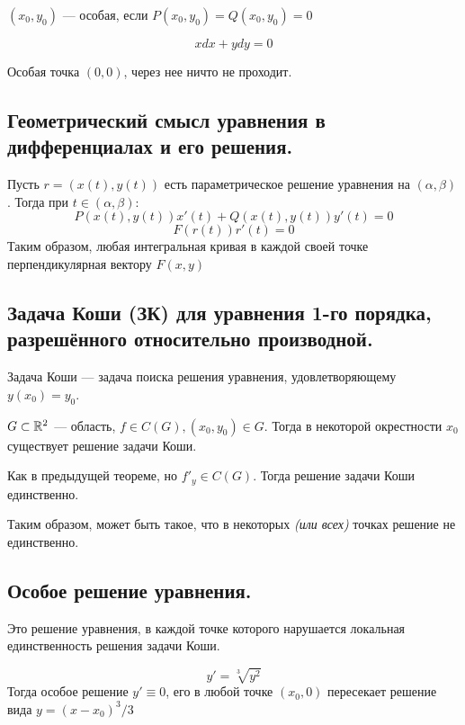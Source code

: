 \((x_0, y_0)\) --- особая, если \(P(x_0, y_0) = Q(x_0, y_0) = 0\)

\begin{example}
    \[xdx + ydy = 0\]

    Особая точка \((0, 0)\), через нее ничто не проходит.
\end{example}

\subsection*{Геометрический смысл уравнения в дифференциалах и его решения.}

Пусть \(r = (x(t), y(t))\) есть параметрическое решение уравнения на \((\alpha, \beta)\). Тогда при \(t\in(\alpha, \beta)\):
\[P(x(t), y(t))x'(t) + Q(x(t), y(t))y'(t) = 0\]
\[F(r(t))r'(t) = 0\]
Таким образом, любая интегральная кривая в каждой своей точке перпендикулярная вектору \(F(x, y)\)

\subsection*{Задача Коши (ЗК) для уравнения 1-го порядка, разрешённого относительно производной.}

Задача Коши --- задача поиска решения уравнения, удовлетворяющему \(y(x_0) = y_0\).

\begin{theorem}
    \(G\subset\mathbb{R}^2\) --- область, \(f\in C(G), (x_0, y_0)\in G\). Тогда в некоторой окрестности \(x_0\) существует решение задачи Коши.
\end{theorem}
\begin{theorem}
    Как в предыдущей теореме, но \(f'_y\in C(G)\). Тогда решение задачи Коши единственно.
\end{theorem}

Таким образом, может быть такое, что в некоторых \textit{(или всех)} точках решение не единственно.

\subsection*{Особое решение уравнения.}

Это решение уравнения, в каждой точке которого нарушается локальная единственность решения задачи Коши.

\begin{example}
    \[y' = \sqrt[3]{y^2}\]
    Тогда особое решение \(y' \equiv 0\), его в любой точке \((x_0, 0)\) пересекает решение вида \(y = (x - x_0)^3 / 3\)
\end{example}

